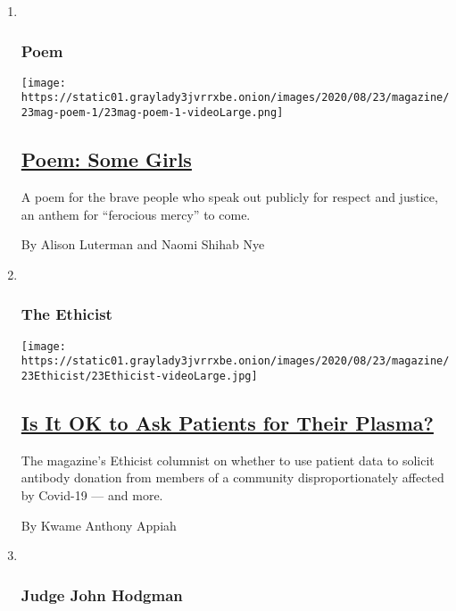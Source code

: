 \begin{enumerate}
\def\labelenumi{\arabic{enumi}.}
\item ~
  \hypertarget{poem}{%
  \subsubsection{Poem}\label{poem}}

  \texttt{[image: https://static01.graylady3jvrrxbe.onion/images/2020/08/23/magazine/23mag-poem-1/23mag-poem-1-videoLarge.png]}

  \hypertarget{poem-some-girls}{%
  \subsection{\texorpdfstring{\href{/2020/08/20/magazine/poem-some-girls.html}{Poem:
  Some Girls}}{Poem: Some Girls}}\label{poem-some-girls}}

  A poem for the brave people who speak out publicly for respect and
  justice, an anthem for ``ferocious mercy'' to come.

  By Alison Luterman and Naomi Shihab Nye
\item ~
  \hypertarget{the-ethicist}{%
  \subsubsection{The Ethicist}\label{the-ethicist}}

  \texttt{[image: https://static01.graylady3jvrrxbe.onion/images/2020/08/23/magazine/23Ethicist/23Ethicist-videoLarge.jpg]}

  \hypertarget{is-it-ok-to-ask-patients-for-their-plasma}{%
  \subsection{\texorpdfstring{\href{/2020/08/18/magazine/is-it-ok-to-ask-patients-for-their-plasma.html}{Is
  It OK to Ask Patients for Their
  Plasma?}}{Is It OK to Ask Patients for Their Plasma?}}\label{is-it-ok-to-ask-patients-for-their-plasma}}

  The magazine's Ethicist columnist on whether to use patient data to
  solicit antibody donation from members of a community
  disproportionately affected by Covid-19 --- and more.

  By Kwame Anthony Appiah
\item ~
  \hypertarget{judge-john-hodgman}{%
  \subsubsection{Judge John Hodgman}\label{judge-john-hodgman}}


\end{enumerate}
